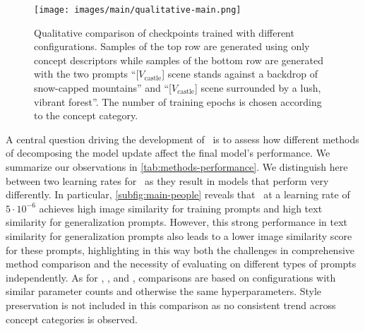 \begin{figure}[t]
    \centering
    \texttt{[image: images/main/qualitative-main.png]}
    \caption{Qualitative comparison of checkpoints trained with different configurations.
    Samples of the top row are generated using only concept descriptors while samples of the bottom row are generated with the two prompts ``[$V_{\text{castle}}$] scene stands against a backdrop of snow-capped mountains''
    and 
    ``[$V_{\text{castle}}$] scene surrounded by a lush, vibrant forest''.
    The number of training epochs is chosen according to the concept category.
    }
    \vspace*{-0.8em}
    \label{fig:qualitative-main}
\end{figure}

A central question driving the development of \lycoris~is to assess how different methods of decomposing the model update affect the final model's performance.
We summarize our observations in \cref{tab:methods-performance}.
We distinguish here between two learning rates for \nt~as they result in models that perform very differently.
In particular, \cref{subfig:main-people} reveals that \nt~at a learning rate of $5\cdot 10^{-6}$ achieves high image similarity for training prompts and high text similarity for generalization prompts.
However, this strong performance in text similarity for generalization prompts also leads to a lower image similarity score for these prompts, highlighting in this way both the challenges in comprehensive method comparison and the necessity of evaluating on different types of prompts independently. As for \lora, \loha, and \lokr, comparisons are based on configurations with similar parameter counts and otherwise the same hyperparameters. Style preservation is not included in this comparison as no consistent trend across concept categories is observed.


